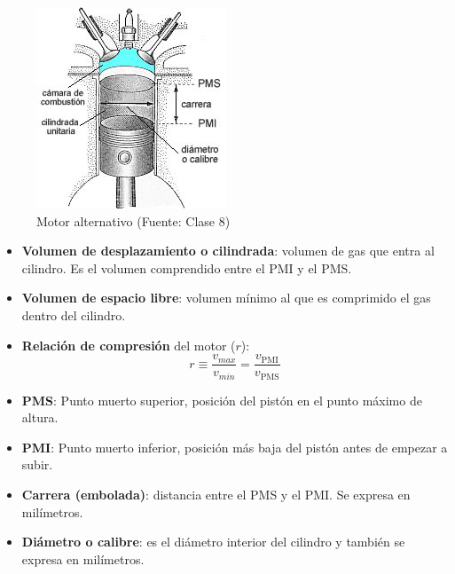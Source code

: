         \begin{multicols}{2}
            \begin{figure}[H]
            \caption{Motor alternativo (Fuente: Clase 8)}
            \label{fig:motor_alter}
                \includegraphics[width=.7\textwidth]{img/clases/motores_alternativos.png}
            \end{figure}
            
            \begin{itemize}
                \item \textbf{Volumen de desplazamiento o cilindrada}: volumen de gas que entra al cilindro. Es el volumen comprendido entre el PMI y el PMS.
                \item \textbf{Volumen de espacio libre}: volumen mínimo al que es comprimido el gas dentro del cilindro.
                \item \textbf{Relación de compresión} del motor (\(r\)):
                \begin{equation}
                \label{rel_comp}
                    r \equiv \frac{v_{max}}{v_{min}} = \frac{v_{\text{PMI}}}{v_{\text{PMS}}}
                \end{equation}
                \vfill \null
                \columnbreak
                
                \item \textbf{PMS}: Punto muerto superior, posición del pistón en el punto máximo de altura.
                \item \textbf{PMI}: Punto muerto inferior, posición más baja del pistón antes de empezar a subir.
                \item \textbf{Carrera (embolada)}: distancia entre el PMS y el PMI. Se expresa en milímetros.
                \item \textbf{Diámetro o calibre}: es el diámetro interior del cilindro y también se expresa en milímetros.
            \end{itemize}
            

\end{multicols}

